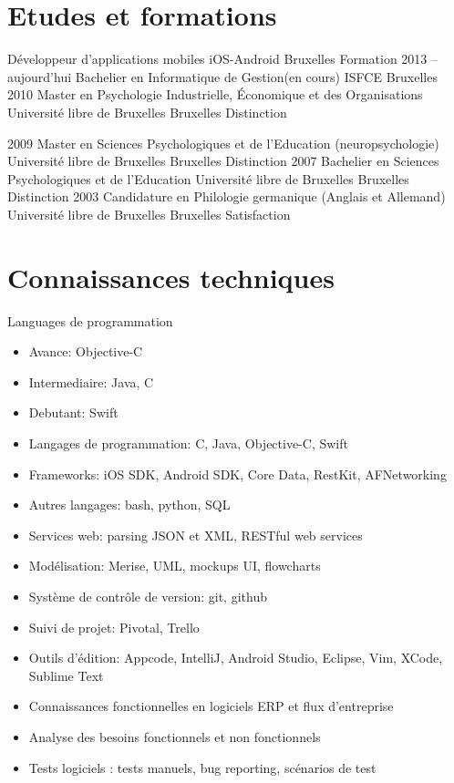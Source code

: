 \documentclass[11pt, a4paper]{moderncv}
\begin{document}
\section{Etudes et formations}
		{Développeur d’applications mobiles iOS-Android}
		{Bruxelles Formation}
		{}
		{}
		{}
	\cventry
		{2013 -- \linebreak aujourd'hui}
		{Bachelier en Informatique de Gestion(en cours)}
		{ISFCE}
		{Bruxelles}
		{}
		{}
	\cventry
		{2010}
		{Master en Psychologie Industrielle, Économique et des 
			Organisations}
		{Université libre de Bruxelles}
		{Bruxelles}
		{Distinction}
		{}

	\cventry
		{2009}
		{Master en Sciences Psychologiques et de l’Education 
			(neuropsychologie)}
		{Université libre de Bruxelles}
		{Bruxelles}
		{Distinction}
		{} 
	\cventry
		{2007}
		{Bachelier en Sciences Psychologiques et de l’Education}
		{Université libre de Bruxelles}
		{Bruxelles}
		{Distinction}
		{}
	\cventry
		{2003}
		{Candidature en Philologie germanique (Anglais et Allemand)}
		{Université libre de Bruxelles}
		{Bruxelles}
		{Satisfaction}
		{}

\section{Connaissances techniques}
	\cvitem
		{Languages de programmation}
		{
			\begin{itemize}
				\item Avance: Objective-C
				\item Intermediaire: Java, C
				\item Debutant: Swift
			\end{itemize}
			}
	\begin{itemize}
		\item Langages de programmation: C, Java, Objective-C, Swift
		\item Frameworks: iOS SDK, Android SDK, Core Data, RestKit, AFNetworking
		\item Autres langages: bash, python, SQL
		\item Services web: parsing JSON et XML,  RESTful web services
		\item Modélisation: Merise, UML, mockups UI, flowcharts
		\item Système de contrôle de version: git, github
		\item Suivi de projet: Pivotal, Trello
		\item Outils d'édition: Appcode, IntelliJ, Android Studio, Eclipse, Vim, XCode, Sublime Text
		\item Connaissances fonctionnelles en logiciels ERP et flux d’entreprise
		\item Analyse des besoins fonctionnels et non fonctionnels
		\item Tests logiciels : tests manuels, bug reporting, scénarios de test
	\end{itemize}
\end{document}
